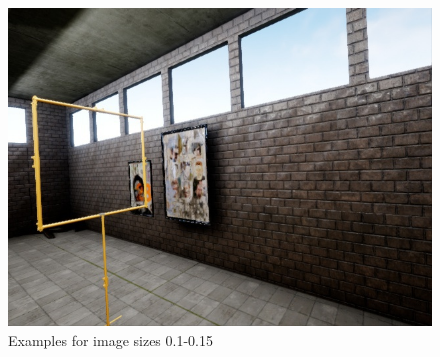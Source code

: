 \documentclass{article}
\begin{document}
\begin{figure}[htbp]
\begin{minipage}{0.3\linewidth}
	\includegraphics[width=\linewidth]{size_examples/01-015 (7).jpg}
\end{minipage}
	\caption{Examples for image sizes 0.1-0.15}
\end{figure}
\end{document}
